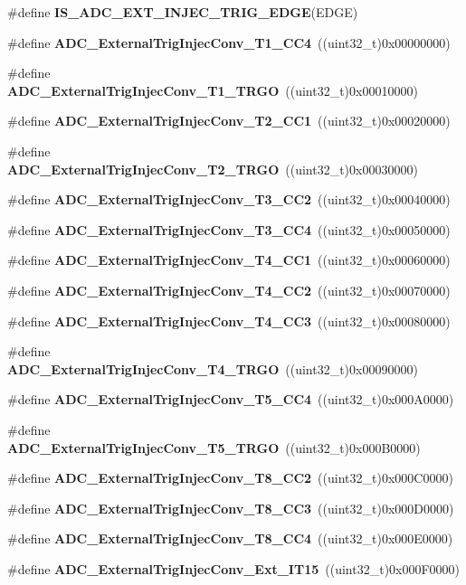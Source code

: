 \begin{DoxyCompactItemize}
\#define \textbf{ I\+S\+\_\+\+A\+D\+C\+\_\+\+E\+X\+T\+\_\+\+I\+N\+J\+E\+C\+\_\+\+T\+R\+I\+G\+\_\+\+E\+D\+GE}(E\+D\+GE)
\item 
\#define \textbf{ A\+D\+C\+\_\+\+External\+Trig\+Injec\+Conv\+\_\+\+T1\+\_\+\+C\+C4}~((uint32\+\_\+t)0x00000000)
\item 
\#define \textbf{ A\+D\+C\+\_\+\+External\+Trig\+Injec\+Conv\+\_\+\+T1\+\_\+\+T\+R\+GO}~((uint32\+\_\+t)0x00010000)
\item 
\#define \textbf{ A\+D\+C\+\_\+\+External\+Trig\+Injec\+Conv\+\_\+\+T2\+\_\+\+C\+C1}~((uint32\+\_\+t)0x00020000)
\item 
\#define \textbf{ A\+D\+C\+\_\+\+External\+Trig\+Injec\+Conv\+\_\+\+T2\+\_\+\+T\+R\+GO}~((uint32\+\_\+t)0x00030000)
\item 
\#define \textbf{ A\+D\+C\+\_\+\+External\+Trig\+Injec\+Conv\+\_\+\+T3\+\_\+\+C\+C2}~((uint32\+\_\+t)0x00040000)
\item 
\#define \textbf{ A\+D\+C\+\_\+\+External\+Trig\+Injec\+Conv\+\_\+\+T3\+\_\+\+C\+C4}~((uint32\+\_\+t)0x00050000)
\item 
\#define \textbf{ A\+D\+C\+\_\+\+External\+Trig\+Injec\+Conv\+\_\+\+T4\+\_\+\+C\+C1}~((uint32\+\_\+t)0x00060000)
\item 
\#define \textbf{ A\+D\+C\+\_\+\+External\+Trig\+Injec\+Conv\+\_\+\+T4\+\_\+\+C\+C2}~((uint32\+\_\+t)0x00070000)
\item 
\#define \textbf{ A\+D\+C\+\_\+\+External\+Trig\+Injec\+Conv\+\_\+\+T4\+\_\+\+C\+C3}~((uint32\+\_\+t)0x00080000)
\item 
\#define \textbf{ A\+D\+C\+\_\+\+External\+Trig\+Injec\+Conv\+\_\+\+T4\+\_\+\+T\+R\+GO}~((uint32\+\_\+t)0x00090000)
\item 
\#define \textbf{ A\+D\+C\+\_\+\+External\+Trig\+Injec\+Conv\+\_\+\+T5\+\_\+\+C\+C4}~((uint32\+\_\+t)0x000\+A0000)
\item 
\#define \textbf{ A\+D\+C\+\_\+\+External\+Trig\+Injec\+Conv\+\_\+\+T5\+\_\+\+T\+R\+GO}~((uint32\+\_\+t)0x000\+B0000)
\item 
\#define \textbf{ A\+D\+C\+\_\+\+External\+Trig\+Injec\+Conv\+\_\+\+T8\+\_\+\+C\+C2}~((uint32\+\_\+t)0x000\+C0000)
\item 
\#define \textbf{ A\+D\+C\+\_\+\+External\+Trig\+Injec\+Conv\+\_\+\+T8\+\_\+\+C\+C3}~((uint32\+\_\+t)0x000\+D0000)
\item 
\#define \textbf{ A\+D\+C\+\_\+\+External\+Trig\+Injec\+Conv\+\_\+\+T8\+\_\+\+C\+C4}~((uint32\+\_\+t)0x000\+E0000)
\item 
\#define \textbf{ A\+D\+C\+\_\+\+External\+Trig\+Injec\+Conv\+\_\+\+Ext\+\_\+\+I\+T15}~((uint32\+\_\+t)0x000\+F0000)

\end{DoxyCompactItemize}

